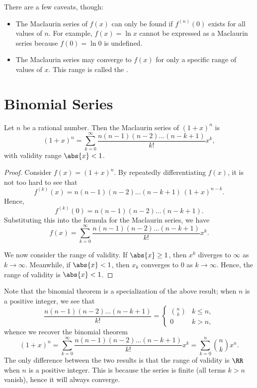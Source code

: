 There are a few caveats, though:
\begin{itemize}
    \item The Maclaurin series of $f(x)$ can only be found if $f^{(n)}(0)$ exists for all values of $n$. For example, $f(x) = \ln x$ cannot be expressed as a Maclaurin series because $f(0) = \ln 0$ is undefined.
    \item The Maclaurin series may converge to $f(x)$ for only a specific range of values of $x$. This range is called the .
\end{itemize}

\section{Binomial Series}

\begin{proposition}
    Let $n$ be a rational number. Then the Maclaurin series of $(1+x)^n$ is \[(1+x)^n = \sum_{k = 0}^\infty \frac{n(n-1)(n-2)\dots(n-k+1)}{k!} x^k,\] with validity range $\abs{x} < 1$.
\end{proposition}
\begin{proof}
    Consider $f(x) = (1 + x)^n$. By repeatedly differentiating $f(x)$, it is not too hard to see that \[f^{(k)}(x) = n(n-1)(n-2)\dots(n-k+1) \, (1 + x)^{n-k}.\] Hence, \[f^{(k)}(0) = n(n-1)(n-2)\dots(n-k+1).\] Substituting this into the formula for the Maclaurin series, we have \[f(x) = \sum_{k = 0}^\infty \frac{n(n-1)(n-2)\dots(n-k+1)}{k!} x^k.\]

    We now consider the range of validity. If $\abs{x} \geq 1$, then $x^k$ diverges to $\infty$ as $k \to \infty$. Meanwhile, if $\abs{x} < 1$, then $x_k$ converges to 0 as $k \to \infty$. Hence, the range of validity is $\abs{x} < 1$.
\end{proof}

Note that the binomial theorem is a specialization of the above result; when $n$ is a positive integer, we see that \[\frac{n(n-1)(n-2)\dots(n-k+1)}{k!} = \begin{cases}
    \binom{n}{k} & k \leq n,\\
    0 & k > n,
\end{cases}\] whence we recover the binomial theorem \[(1+x)^n = \sum_{k = 0}^\infty \frac{n(n-1)(n-2)\dots(n-k+1)}{k!} x^k = \sum_{k = 0}^n \binom{n}{k} x^n.\] The only difference between the two results is that the range of validity is $\RR$ when $n$ is a positive integer. This is because the series is finite (all terms $k > n$ vanish), hence it will always converge.

